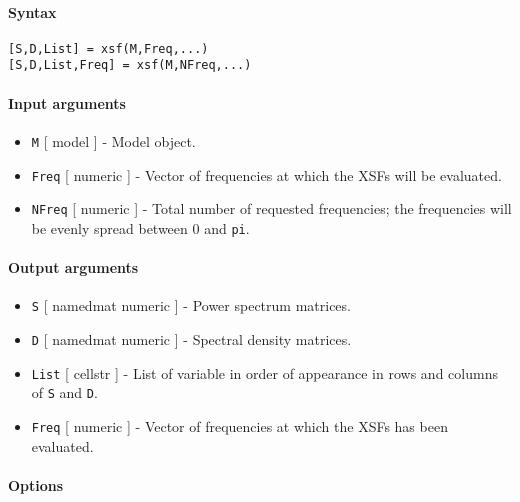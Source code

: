 


	\paragraph{Syntax}\label{syntax}

\begin{verbatim}
[S,D,List] = xsf(M,Freq,...)
[S,D,List,Freq] = xsf(M,NFreq,...)
\end{verbatim}

\paragraph{Input arguments}\label{input-arguments}

\begin{itemize}
\item
  \texttt{M} {[} model {]} - Model object.
\item
  \texttt{Freq} {[} numeric {]} - Vector of frequencies at which the
  XSFs will be evaluated.
\item
  \texttt{NFreq} {[} numeric {]} - Total number of requested
  frequencies; the frequencies will be evenly spread between 0 and
  \texttt{pi}.
\end{itemize}

\paragraph{Output arguments}\label{output-arguments}

\begin{itemize}
\item
  \texttt{S} {[} namedmat \textbar{} numeric {]} - Power spectrum
  matrices.
\item
  \texttt{D} {[} namedmat \textbar{} numeric {]} - Spectral density
  matrices.
\item
  \texttt{List} {[} cellstr {]} - List of variable in order of
  appearance in rows and columns of \texttt{S} and \texttt{D}.
\item
  \texttt{Freq} {[} numeric {]} - Vector of frequencies at which the
  XSFs has been evaluated.
\end{itemize}

\paragraph{Options}\label{options}

